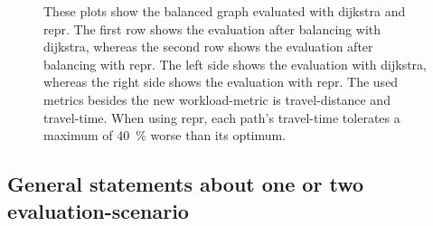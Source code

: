         \begin{figure}[hb]
            \centering%
            \hfill%

            \hfill%
            \caption[Workloads on the balanced graph]{%
                These plots show the balanced graph evaluated with \gls{dijkstra} and \gls{repr}.
                The first row shows the evaluation after \gls{balancing} with \gls{dijkstra}, whereas the second row shows the evaluation after \gls{balancing} with \gls{repr}.
                The left side shows the evaluation with \gls{dijkstra}, whereas the right side shows the evaluation with \gls{repr}.
                The used \glspl{metric} besides the new workload-\gls{metric} is travel-distance and travel-time.
                When using \gls{repr}, each path's travel-time tolerates a maximum of \si{\num{40} \percent} worse than its optimum.
                \label{fig:both/both/workloads}
            }
        \end{figure}

    \subsection{General statements about one or two evaluation-scenario}

